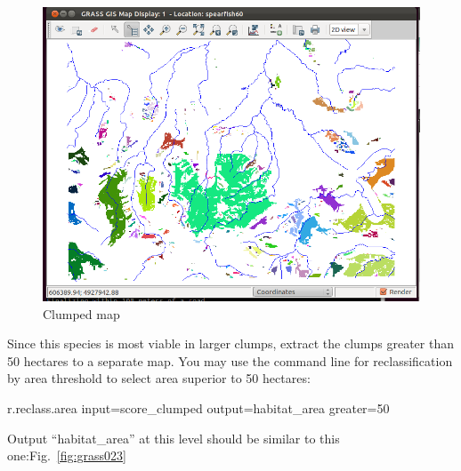 \begin{figure}[htbp]
   \centering
   \includegraphics[scale=0.35]{grass022.png}
   \caption{Clumped map}
   \label{fig:grass022}
\end{figure}


Since this species is most viable in larger clumps, extract the clumps greater than 50 hectares to a separate map. You may use the command line for reclassification by area threshold to select area superior to 50 hectares:

\begin{smallverbatim}
r.reclass.area input=score_clumped
 output=habitat_area greater=50
\end{smallverbatim}

Output ``habitat\_area'' at this level should be similar to this one:Fig.~\ref{fig:grass023}

